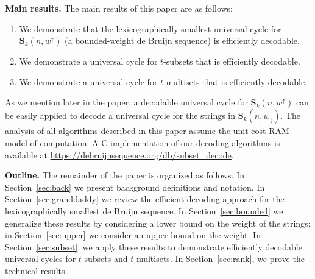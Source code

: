 \documentclass[US-letter,USenglish,authorcolumns,autoref]{lipics-v2021}
\newcommand{\bS}{\mathbf{S}}
\begin{document}



\bigskip

\noindent
{\bf Main results.} 
The main results of this paper are as follows:

\begin{enumerate}
    \item We demonstrate that the lexicographically smallest universal cycle for $\bS_k(n,w^\uparrow)$ (a bounded-weight de Bruijn sequence) is efficiently decodable. 
    \item We demonstrate a universal cycle for $t$-subsets that is efficiently decodable.
    \item We demonstrate a universal cycle for $t$-multisets that is efficiently decodable.
\end{enumerate}

    



%
\noindent
As we mention later in the paper, a decodable universal cycle for $\bS_k(n,w^\uparrow)$ can be easily applied to decode a universal cycle for the strings in $\bS_k(n,w_\downarrow)$.
The analysis of all algorithms described in this paper assume the unit-cost RAM model of computation. A C implementation of our decoding algorithms is available at \url{https://debruijnsequence.org/db/subset_decode}.





\bigskip

\noindent
{\bf Outline.}
The remainder of the paper is organized as follows.  In Section~\ref{sec:back} we present background definitions and notation.  In Section~\ref{sec:granddaddy} we review the efficient decoding approach for the lexicographically smallest de Bruijn sequence. In Section~\ref{sec:bounded} we generalize these results by considering a lower bound on the weight of the strings;  in Section~\ref{sec:upper} we consider an upper bound on the weight.
%
In Section~\ref{sec:subset}, we apply these results to demonstrate efficiently decodable universal cycles for $t$-subsets and $t$-multisets.  In Section~\ref{sec:rank}, we prove the technical results. 
\end{document}
